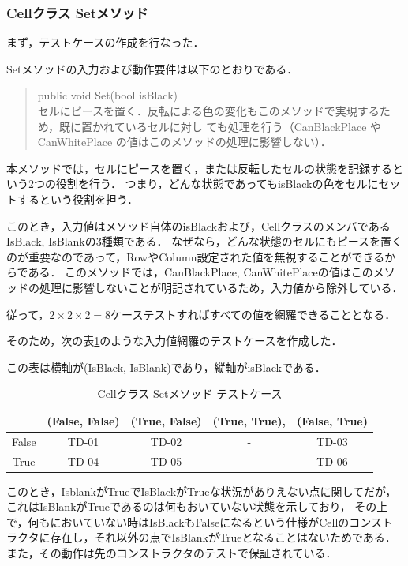 \documentclass[platex,dvipdfmx,12pt]{jsarticle}
\begin{document}
\subsubsection{Cellクラス Setメソッド}
まず，テストケースの作成を行なった．

Setメソッドの入力および動作要件は以下のとおりである．

\begin{quote}
public void Set(bool isBlack)\\

セルにピースを置く．反転による色の変化もこのメソッドで実現するため，既に置かれているセルに対し
ても処理を行う（CanBlackPlace や CanWhitePlace の値はこのメソッドの処理に影響しない）．
\end{quote}

本メソッドでは，セルにピースを置く，または反転したセルの状態を記録するという2つの役割を行う．
つまり，どんな状態であってもisBlackの色をセルにセットするという役割を担う．

このとき，入力値はメソッド自体のisBlackおよび，CellクラスのメンバであるIsBlack, IsBlankの3種類である．
なぜなら，どんな状態のセルにもピースを置くのが重要なのであって，RowやColumn設定された値を無視することができるからである．
このメソッドでは，CanBlackPlace, CanWhitePlaceの値はこのメソッドの処理に影響しないことが明記されているため，入力値から除外している．

従って，$2\times 2\times 2=8$ケーステストすればすべての値を網羅できることとなる．

そのため，次の表\ref{tab:enshu5-cell-set-tds}のような入力値網羅のテストケースを作成した．

この表は横軸が(IsBlack, IsBlank)であり，縦軸がisBlackである．

\begin{table}[H]
  \centering
  \caption{Cellクラス Setメソッド テストケース}
  \label{tab:enshu5-cell-set-tds}
  \begin{tabular}{c|cccc}
    & (False, False) & (True, False) & (True, True), & (False, True) \\
    \hline
    False & TD-01 & TD-02 & - & TD-03 \\
    True & TD-04 & TD-05 & - & TD-06 \\
  \end{tabular}
\end{table}

このとき，IsblankがTrueでIsBlackがTrueな状況がありえない点に関してだが，これはIsBlankがTrueであるのは何もおいていない状態を示しており，
その上で，何もにおいていない時はIsBlackもFalseになるという仕様がCellのコンストラクタに存在し，それ以外の点でIsBlankがTrueとなることはないためである．
また，その動作は先のコンストラクタのテストで保証されている．
\end{document}
